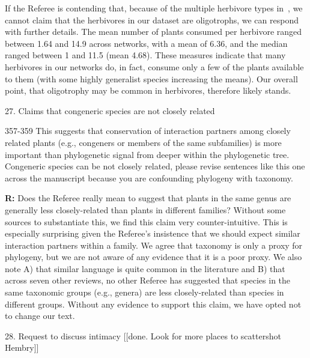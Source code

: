 \documentclass[12pt]{letter}
\newenvironment{refquote}{\bigskip \begin{it}}{\end{it}\smallskip}
\begin{document}
		If the Referee is contending that, because of the multiple herbivore types in~\citet{Novotny2005}, we cannot claim that the herbivores in our dataset are oligotrophs, we can respond with further details. The mean number of plants consumed per herbivore ranged between 1.64 and 14.9 across networks, with a mean of 6.36, and the median ranged between 1 and 11.5 (mean 4.68). These measures indicate that many herbivores in our networks do, in fact, consume only a few of the plants available to them (with some highly generalist species increasing the means). Our overall point, that oligotrophy may be common in herbivores, therefore likely stands.


	27. Claims that congeneric species are not closely related 

		\begin{refquote}
			357-359 This suggests that conservation of interaction partners among closely related plants (e.g., congeners or members of the same subfamilies) is more important than phylogenetic signal from deeper within the phylogenetic tree. Congeneric species can be not closely related, please revise sentences like this one across the manuscript because you are confounding phylogeny with taxonomy.
		\end{refquote}


		\textbf{R:} Does the Referee really mean to suggest that plants in the same genus are generally less closely-related than plants in different families? Without some sources to substantiate this, we find this claim very counter-intuitive. This is especially surprising given the Referee's insistence that we should expect similar interaction partners within a family. We agree that taxonomy is only a proxy for phylogeny, but we are not aware of any evidence that it is a poor proxy. We also note A) that similar language is quite common in the literature and B) that across seven other reviews, no other Referee has suggested that species in the same taxonomic groups (e.g., genera) are less closely-related than species in different groups. Without any evidence to support this claim, we have opted not to change our text.


	28. Request to discuss intimacy [[done. Look for more places to scattershot Hembry]]
\end{document}
